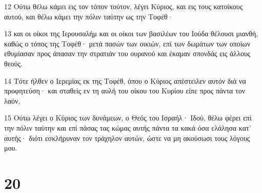 \par 12 Ούτω θέλω κάμει εις τον τόπον τούτον, λέγει Κύριος, και εις τους κατοίκους αυτού, και θέλω κάμει την πόλιν ταύτην ως την Τοφέθ·
\par 13 και οι οίκοι της Ιερουσαλήμ και οι οίκοι των βασιλέων του Ιούδα θέλουσι μιανθή, καθώς ο τόπος της Τοφέθ· μετά πασών των οικιών, επί των δωμάτων των οποίων εθυμίασαν προς άπασαν την στρατιάν του ουρανού και έκαμαν σπονδάς εις άλλους θεούς.
\par 14 Τότε ήλθεν ο Ιερεμίας εκ της Τοφέθ, όπου ο Κύριος απέστειλεν αυτόν διά να προφητεύση· και σταθείς εν τη αυλή του οίκου του Κυρίου είπε προς πάντα τον λαόν,
\par 15 Ούτω λέγει ο Κύριος των δυνάμεων, ο Θεός του Ισραήλ· Ιδού, θέλω φέρει επί την πόλιν ταύτην και επί πάσας τας κώμας αυτής πάντα τα κακά όσα ελάλησα κατ' αυτής· διότι εσκλήρυναν τον τράχηλον αυτών, ώστε να μη ακούσωσι τους λόγους μου.

\chapter{20}

